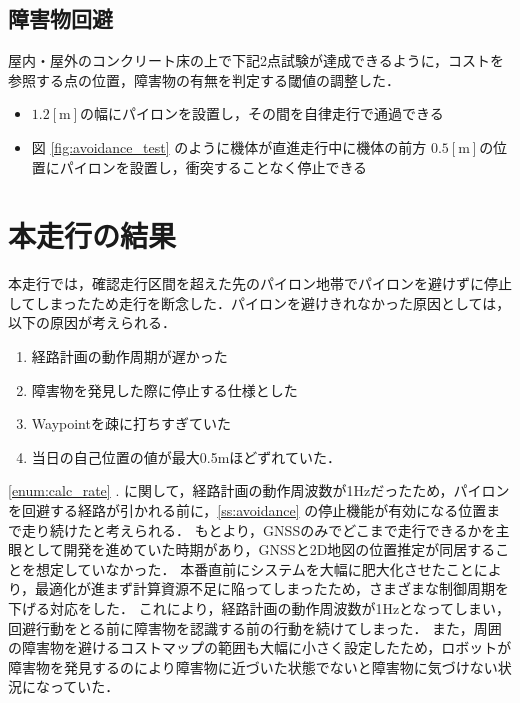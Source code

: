 \documentclass[platex,dvipdfmx]{rbproceedings}
\begin{document}
\subsection{障害物回避}

屋内・屋外のコンクリート床の上で下記2点試験が達成できるように，コストを参照する点の位置，障害物の有無を判定する閾値の調整した．
\begin{itemize}
    \item $1.2[\mathrm{m}]$の幅にパイロンを設置し，その間を自律走行で通過できる
    \item 図 \ref{fig:avoidance_test} のように機体が直進走行中に機体の前方  $0.5[\mathrm{m}]$の位置にパイロンを設置し，衝突することなく停止できる
\end{itemize}

\section{本走行の結果}
本走行では，確認走行区間を超えた先のパイロン地帯でパイロンを避けずに停止してしまったため走行を断念した．パイロンを避けきれなかった原因としては，以下の原因が考えられる．

\begin{enumerate}
    \item 経路計画の動作周期が遅かった \label{enum:calc_rate}
    \item 障害物を発見した際に停止する仕様とした \label{enum:stop}
    \item Waypointを疎に打ちすぎていた \label{eunm:waypoint}
    \item 当日の自己位置の値が最大0.5mほどずれていた．\label{eunm:gnss}
\end{enumerate}

\ref{enum:calc_rate} . に関して，経路計画の動作周波数が1Hzだったため，パイロンを回避する経路が引かれる前に，\ref{ss:avoidance} の停止機能が有効になる位置まで走り続けたと考えられる．
もとより，GNSSのみでどこまで走行できるかを主眼として開発を進めていた時期があり，GNSSと2D地図の位置推定が同居することを想定していなかった．
本番直前にシステムを大幅に肥大化させたことにより，最適化が進まず計算資源不足に陥ってしまったため，さまざまな制御周期を下げる対応をした．
これにより，経路計画の動作周波数が1Hzとなってしまい，回避行動をとる前に障害物を認識する前の行動を続けてしまった．
また，周囲の障害物を避けるコストマップの範囲も大幅に小さく設定したため，ロボットが障害物を発見するのにより障害物に近づいた状態でないと障害物に気づけない状況になっていた．
\end{document}
